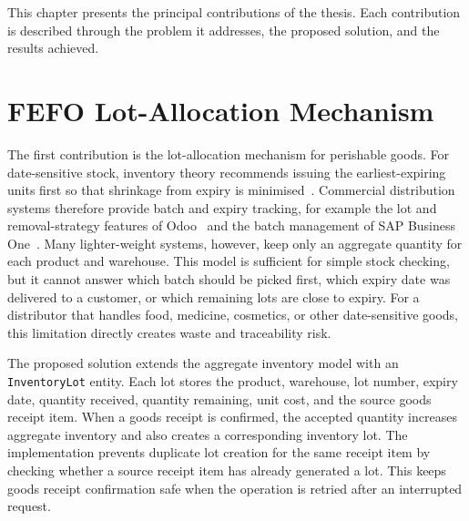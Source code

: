 This chapter presents the principal contributions of the thesis. Each contribution
is described through the problem it addresses, the proposed solution, and the
results achieved.

\section{FEFO Lot-Allocation Mechanism}
The first contribution is the lot-allocation mechanism for perishable goods.
For date-sensitive stock, inventory theory recommends issuing the
earliest-expiring units first so that shrinkage from expiry is
minimised~\cite{silver1998inventory, richards2021warehouse}. Commercial
distribution systems therefore provide batch and expiry tracking, for example the
lot and removal-strategy features of Odoo~\cite{odooFefo} and the batch
management of SAP Business One~\cite{sapBatch}. Many lighter-weight systems,
however, keep only an aggregate quantity for each product and warehouse. This
model is sufficient for simple stock checking, but it cannot answer which batch
should be picked first, which expiry date was delivered to a customer, or which
remaining lots are close to expiry. For a distributor that handles food,
medicine, cosmetics, or other date-sensitive goods, this limitation directly
creates waste and traceability risk.

The proposed solution extends the aggregate inventory model with an
\texttt{InventoryLot} entity. Each lot stores the product, warehouse, lot number,
expiry date, quantity received, quantity remaining, unit cost, and the source
goods receipt item. When a goods receipt is confirmed, the accepted quantity
increases aggregate inventory and also creates a corresponding inventory lot.
The implementation prevents duplicate lot creation for the same receipt item by
checking whether a source receipt item has already generated a lot. This keeps
goods receipt confirmation safe when the operation is retried after an
interrupted request.

